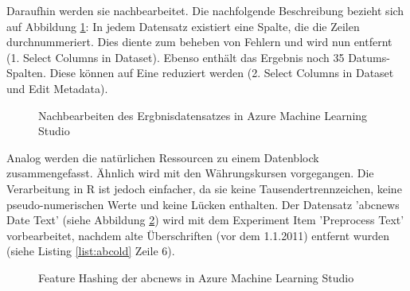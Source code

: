 Daraufhin werden sie nachbearbeitet. Die nachfolgende Beschreibung bezieht sich auf Abbildung \ref{fig:indicesAzure_2}: In jedem Datensatz existiert eine Spalte, die die Zeilen durchnummeriert. Dies diente zum beheben von Fehlern und wird nun entfernt (1. Select Columns in Dataset). Ebenso enthält das Ergebnis noch 35 Datums-Spalten. Diese können auf Eine reduziert werden (2. Select Columns in Dataset und Edit Metadata).
\begin{figure}[H]
\caption{Nachbearbeiten des Ergbnisdatensatzes in Azure Machine Learning Studio}
\label{fig:indicesAzure_2}
\centering
\end{figure}
Analog werden die natürlichen Ressourcen zu einem Datenblock zusammengefasst. Ähnlich wird mit den Währungskursen vorgegangen. Die Verarbeitung in R ist jedoch einfacher, da sie keine Tausendertrennzeichen, keine pseudo-numerischen Werte und keine Lücken enthalten. 
Der Datensatz 'abcnews \textunderscore Date \textunderscore Text' (siehe Abbildung \ref{fig:abcAzure1}) wird mit dem Experiment Item 'Preprocess Text' vorbearbeitet, nachdem alte Überschriften (vor dem 1.1.2011) entfernt wurden (siehe Listing \ref{list:abcold} Zeile 6). 
\begin{figure}[H]
\caption{Feature Hashing der abcnews in Azure Machine Learning Studio}
\label{fig:abcAzure1}
\centering
\end{figure}
